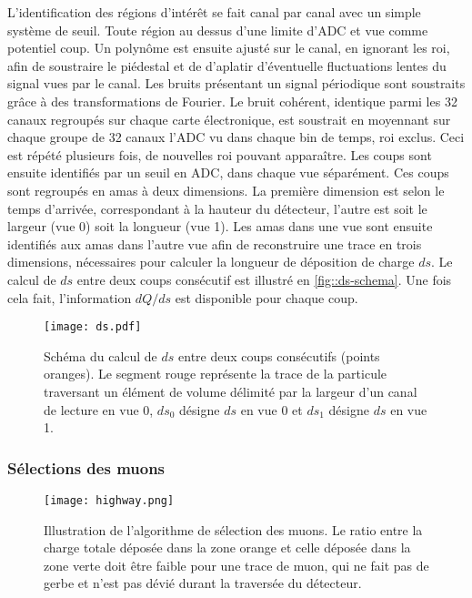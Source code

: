         L'identification des régions d'intérêt se fait canal par canal avec un simple  système de seuil. Toute région au dessus d'une limite d'ADC et vue comme potentiel coup. Un polynôme est ensuite ajusté sur le canal, en ignorant les \gls{roi}, afin de soustraire le piédestal et de d'aplatir d'éventuelle fluctuations lentes du signal vues par le canal. Les bruits présentant un signal périodique sont soustraits grâce à des transformations de Fourier. Le bruit cohérent, identique parmi les 32 canaux regroupés sur chaque carte électronique, est soustrait en moyennant sur chaque groupe de 32 canaux l'ADC vu dans chaque bin de temps, \gls{roi} exclus. Ceci est répété plusieurs fois, de nouvelles \gls{roi} pouvant apparaître. Les coups sont ensuite identifiés par un seuil en ADC, dans chaque vue séparément. Ces coups sont regroupés en amas à deux dimensions. La première dimension est selon le temps d'arrivée, correspondant à la hauteur du détecteur, l'autre est soit le largeur (vue 0) soit la longueur (vue 1). Les amas dans une vue sont ensuite identifiés aux amas dans l'autre vue afin de reconstruire une trace en trois dimensions, nécessaires pour calculer la longueur de déposition de charge $ds$. Le calcul de $ds$ entre deux coups consécutif est illustré en \autoref{fig::ds-schema}. Une fois cela fait, l'information $dQ/ds$ est disponible pour chaque coup.

        \begin{figure}[htbp]
          \centering
          \texttt{[image: ds.pdf]}
          \caption[Schéma du calcul de $ds$]{\label{fig::ds-schema}Schéma du calcul de $ds$ entre deux coups consécutifs (points oranges). Le segment rouge représente la trace de la particule traversant un élément de volume délimité par la largeur d'un canal de lecture en vue 0, $ds_0$ désigne $ds$ en vue 0 et $ds_1$ désigne $ds$ en vue 1.}
        \end{figure}

      \subsubsection{Sélections des muons}\label{sec::selection}

        \begin{figure}[htbp]
          \centering
          \texttt{[image: highway.png]}
          \caption[Illustration de l'algorithme de sélection des muons]{\label{fig::highway}Illustration de l'algorithme de sélection des muons. Le ratio entre la charge totale déposée dans la zone orange et celle déposée dans la zone verte doit être faible pour une trace de muon, qui ne fait pas de gerbe et n'est pas dévié durant la traversée du détecteur.}
        \end{figure}

